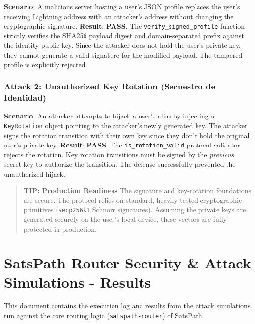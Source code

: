 \documentclass[
]{article}
\begin{document}
\textbf{Scenario}: A malicious server hosting a user's JSON profile
replaces the user's receiving Lightning address with an attacker's
address without changing the cryptographic signature. \textbf{Result}:
\textbf{PASS}. The \texttt{verify\_signed\_profile} function strictly
verifies the SHA256 payload digest and domain-separated prefix against
the identity public key. Since the attacker does not hold the user's
private key, they cannot generate a valid signature for the modified
payload. The tampered profile is explicitly rejected.

\hypertarget{attack-2-unauthorized-key-rotation-secuestro-de-identidad}{%
\subsubsection{Attack 2: Unauthorized Key Rotation (Secuestro de
Identidad)}\label{attack-2-unauthorized-key-rotation-secuestro-de-identidad}}

\textbf{Scenario}: An attacker attempts to hijack a user's alias by
injecting a \texttt{KeyRotation} object pointing to the attacker's newly
generated key. The attacker signs the rotation transition with their own
key since they don't hold the original user's private key.
\textbf{Result}: \textbf{PASS}. The \texttt{is\_rotation\_valid}
protocol validator rejects the rotation. Key rotation transitions must
be signed by the \emph{previous} secret key to authorize the transition.
The defense successfully prevented the unauthorized hijack.

\begin{quote}
\textbf{TIP:} \textbf{Production Readiness} The signature and
key-rotation foundations are secure. The protocol relies on standard,
heavily-tested cryptographic primitives (\texttt{secp256k1} Schnorr
signatures). Assuming the private keys are generated securely on the
user's local device, these vectors are fully protected in production.
\end{quote}

\hypertarget{satspath-router-security-attack-simulations---results}{%
\section{SatsPath Router Security \& Attack Simulations -
Results}\label{satspath-router-security-attack-simulations---results}}

This document contains the execution log and results from the attack
simulations run against the core routing logic
(\texttt{satspath-router}) of SatsPath.
\end{document}

